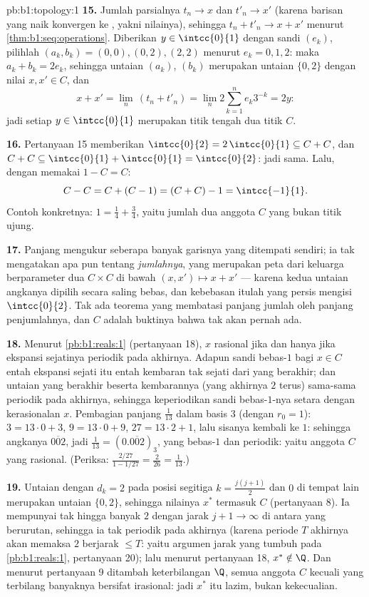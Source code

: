 \begin{solution}{pb:b1:topology:1}
\textbf{15.} Jumlah parsialnya $t_n \to x$ dan $t'_n \to x'$
(karena barisan yang naik konvergen ke , yakni
nilainya), sehingga $t_n + t'_n \to x + x'$ menurut
\cref{thm:b1:seq:operations}. Diberikan $y \in \intcc{0}{1}$ dengan
sandi $(e_k)$, pilihlah $(a_k, b_k) = (0,0), (0,2), (2,2)$
menurut $e_k = 0, 1, 2$: maka $a_k + b_k = 2e_k$, sehingga
untaian $(a_k)$, $(b_k)$ merupakan untaian $\{0,2\}$ dengan nilai $x,
x' \in C$, dan
\[
x + x' = \lim_n\,(t_n + t'_n) = \lim_n 2\sum_{k=1}^n e_k 3^{-k}
= 2y :
\]
jadi setiap $y \in \intcc{0}{1}$ merupakan titik tengah dua titik $C$.

\textbf{16.} Pertanyaan 15 memberikan $\intcc{0}{2} = 2\,\intcc{0}{1}
\subseteq C + C$, dan $C + C \subseteq \intcc{0}{1} +
\intcc{0}{1} = \intcc{0}{2}$: jadi sama. Lalu, dengan memakai $1 - C = C$:
\[
C - C = C + (C - 1) = (C + C) - 1 = \intcc{-1}{1} .
\]
Contoh konkretnya: $1 = \frac14 + \frac34$, yaitu jumlah dua
anggota $C$ yang bukan titik ujung.

\textbf{17.} Panjang mengukur seberapa banyak garisnya yang ditempati 
sendiri; ia tak mengatakan apa pun tentang  \emph{jumlahnya}, yang merupakan
peta dari keluarga berparameter dua $C \times C$ di bawah $(x,
x') \mapsto x + x'$ --- karena kedua untaian angkanya dipilih
secara saling bebas, dan kebebasan itulah yang persis mengisi
$\intcc{0}{2}$. Tak ada teorema yang membatasi panjang  jumlah oleh
panjang penjumlahnya, dan $C$ adalah buktinya bahwa tak akan pernah ada.

\textbf{18.} Menurut \cref{pb:b1:reals:1} (pertanyaan 18), $x$
rasional jika dan hanya jika ekspansi sejatinya periodik pada akhirnya. Adapun
sandi bebas-$1$ bagi $x \in C$ entah ekspansi sejati itu entah
kembaran tak sejati dari yang berakhir; dan untaian yang berakhir beserta
kembarannya (yang akhirnya $2$ terus) sama-sama periodik pada
akhirnya, sehingga keperiodikan sandi bebas-$1$-nya setara dengan
kerasionalan $x$. Pembagian panjang $\frac1{13}$ dalam basis $3$
(dengan $r_0 = 1$): $3 = 13\cdot0 + 3$, $9 = 13\cdot0 + 9$, $27 =
13\cdot2 + 1$, lalu sisanya kembali ke $1$: sehingga angkanya
$\overline{002}$, jadi $\frac1{13} = (0.\overline{002})_3$,
yang bebas-$1$ dan periodik: yaitu anggota $C$ yang rasional. (Periksa:
$\frac{2/27}{1 - 1/27} = \frac{2}{26} = \frac1{13}$.)

\textbf{19.} Untaian dengan $d_k = 2$ pada posisi
segitiga $k = \frac{j(j+1)}{2}$ dan $0$ di tempat lain merupakan
untaian $\{0,2\}$, sehingga nilainya $x^*$ termasuk $C$ (pertanyaan
8). Ia mempunyai tak hingga banyak $2$ dengan jarak $j + 1 \to \infty$
di antara yang berurutan, sehingga ia tak periodik pada akhirnya (karena
periode $T$ akhirnya akan memaksa $2$ berjarak $\leq T$: yaitu argumen
jarak yang tumbuh pada \cref{pb:b1:reals:1}, pertanyaan 20); lalu menurut
pertanyaan 18, $x^* \notin \Q$. Dan menurut pertanyaan 9 ditambah
keterbilangan $\Q$, semua anggota $C$ kecuali yang terbilang banyaknya bersifat
irasional: jadi $x^*$ itu lazim, bukan kekecualian.


\end{solution}
